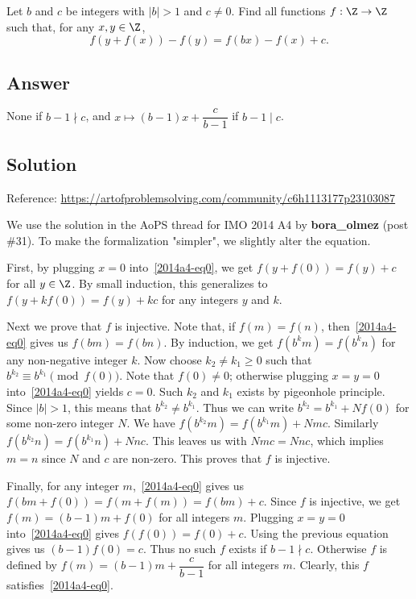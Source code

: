 Let $b$ and $c$ be integers with $|b| > 1$ and $c \neq 0$.
Find all functions $f : \Z \to \Z$ such that, for any $x, y \in \Z$,
\[ f(y + f(x)) - f(y) = f(bx) - f(x) + c. \tag{*}\label{2014a4-eq0} \]



\subsection*{Answer}

None if $b - 1 \nmid c$, and $x \mapsto (b - 1)x + \dfrac{c}{b - 1}$ if $b - 1 \mid c$.



\subsection*{Solution}

Reference: \url{https://artofproblemsolving.com/community/c6h1113177p23103087}

We use the solution in the AoPS thread for IMO 2014 A4 by \textbf{bora\_olmez} (post \#31).
To make the formalization "simpler", we slightly alter the equation.

First, by plugging $x = 0$ into~\eqref{2014a4-eq0}, we get $f(y + f(0)) = f(y) + c$ for all $y \in \Z$.
By small induction, this generalizes to $f(y + k f(0)) = f(y) + kc$ for any integers $y$ and $k$.

Next we prove that $f$ is injective.
Note that, if $f(m) = f(n)$, then~\eqref{2014a4-eq0} gives us $f(bm) = f(bn)$.
By induction, we get $f(b^k m) = f(b^k n)$ for any non-negative integer $k$.
Now choose $k_2 \neq k_1 \geq 0$ such that $b^{k_2} \equiv b^{k_1} \pmod{f(0)}$.
Note that $f(0) \neq 0$; otherwise plugging $x = y = 0$ into~\eqref{2014a4-eq0} yields $c = 0$.
Such $k_2$ and $k_1$ exists by pigeonhole principle.
Since $|b| > 1$, this means that $b^{k_2} \neq b^{k_1}$.
Thus we can write $b^{k_2} = b^{k_1} + N f(0)$ for some non-zero integer $N$.
We have $f(b^{k_2} m) = f(b^{k_1} m) + Nm c$.
Similarly $f(b^{k_2} n) = f(b^{k_1} n) + Nn c$.
This leaves us with $Nm c = Nn c$, which implies $m = n$ since $N$ and $c$ are non-zero.
This proves that $f$ is injective.

Finally, for any integer $m$,~\eqref{2014a4-eq0} gives us $f(bm + f(0)) = f(m + f(m)) = f(bm) + c$.
Since $f$ is injective, we get $f(m) = (b - 1)m + f(0)$ for all integers $m$.
Plugging $x = y = 0$ into~\eqref{2014a4-eq0} gives $f(f(0)) = f(0) + c$.
Using the previous equation gives us $(b - 1) f(0) = c$.
Thus no such $f$ exists if $b - 1 \nmid c$.
Otherwise $f$ is defined by $f(m) = (b - 1)m + \dfrac{c}{b - 1}$ for all integers $m$.
Clearly, this $f$ satisfies~\eqref{2014a4-eq0}.

